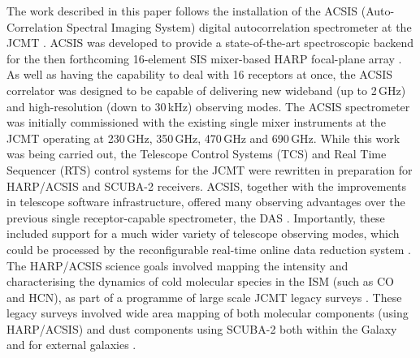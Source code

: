 \documentclass[a4paper,fleqn,usenatbib]{mnras}
\begin{document}
The work described in this paper follows the installation of the ACSIS
(Auto-Correlation Spectral Imaging System) digital autocorrelation
spectrometer at the JCMT \citep{2009MNRAS.399.1026B}. ACSIS was
developed to provide a state-of-the-art spectroscopic backend for the
then forthcoming 16-element SIS mixer-based HARP focal-plane array \citep{2003SPIE.4855..338S}. As
well as having the capability to deal with 16 receptors at once, the
ACSIS correlator was designed to be capable of delivering new wideband
(up to 2\,GHz) and high-resolution (down to 30\,kHz) observing
modes. The ACSIS spectrometer was initially commissioned with the
existing single mixer instruments at the JCMT operating at 230\,GHz,
350\,GHz, 470\,GHz and 690\,GHz. While this work was being carried
out, the Telescope Control Systems (TCS) and Real Time Sequencer (RTS)
control systems \citep{2002SPIE.4848..283R} for the JCMT were
rewritten in preparation for HARP/ACSIS and SCUBA-2
\citep{2013MNRAS.430.2513H} receivers. ACSIS,
together with the improvements in telescope software infrastructure,
offered many observing advantages over the previous single
receptor-capable spectrometer, the DAS \citep[Dutch Autocorrelation
Spectrometer;][]{1986SPIE..598..134B}. Importantly, these included
support for a much wider variety of telescope observing modes, which
could be processed by the reconfigurable real-time online data reduction
system \citep{2000ASPC..216..502L}. The HARP/ACSIS
science goals involved mapping the intensity and characterising the
dynamics of cold molecular species in the ISM (such as CO and HCN), as
part of a programme of large scale JCMT legacy surveys
\citep{2010HiA....15..797C}. These legacy surveys involved wide area
mapping of both molecular components (using HARP/ACSIS) and dust
components using SCUBA-2 both within the
Galaxy \citep{2007PASP..119..855W} and for external galaxies
\citep{2009ApJ...693.1736W}.
\end{document}
